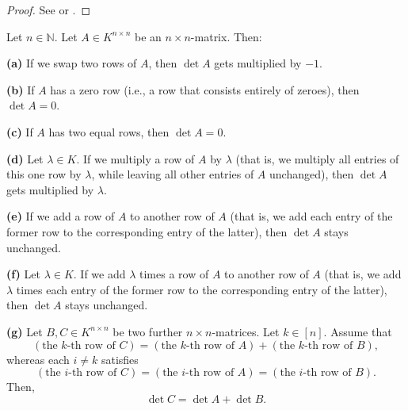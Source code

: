 \begin{proof}
\leanok
See \cite[Proposition B.11]{Strick13} or \cite[Exercise 6.3 and the paragraph
after Exercise 6.4]{detnotes}.
\end{proof}

\begin{theorem}
\label{thm.det.rowop}
\leantarget
\leanok
Let $n \in \mathbb{N}$. Let $A \in K^{n \times n}$ be an $n \times n$-matrix. Then:

\textbf{(a)} If we swap two rows of $A$, then $\det A$ gets multiplied by $-1$.

\textbf{(b)} If $A$ has a zero row (i.e., a row that consists entirely of zeroes),
then $\det A = 0$.

\textbf{(c)} If $A$ has two equal rows, then $\det A = 0$.

\textbf{(d)} Let $\lambda \in K$. If we multiply a row of $A$ by $\lambda$
(that is, we multiply all entries of this one row by $\lambda$, while leaving
all other entries of $A$ unchanged), then $\det A$ gets multiplied by $\lambda$.

\textbf{(e)} If we add a row of $A$ to another row of $A$ (that is, we add
each entry of the former row to the corresponding entry of the latter), then
$\det A$ stays unchanged.

\textbf{(f)} Let $\lambda \in K$. If we add $\lambda$ times a row of $A$ to
another row of $A$ (that is, we add $\lambda$ times each entry of the former
row to the corresponding entry of the latter), then $\det A$ stays unchanged.

\textbf{(g)} Let $B, C \in K^{n \times n}$ be two further $n \times n$-matrices.
Let $k \in [n]$. Assume that
\[
  (\text{the } k\text{-th row of } C)
  = (\text{the } k\text{-th row of } A)
  + (\text{the } k\text{-th row of } B),
\]
whereas each $i \neq k$ satisfies
\[
  (\text{the } i\text{-th row of } C)
  = (\text{the } i\text{-th row of } A)
  = (\text{the } i\text{-th row of } B).
\]
Then,
\[
  \det C = \det A + \det B.
\]
\end{theorem}

